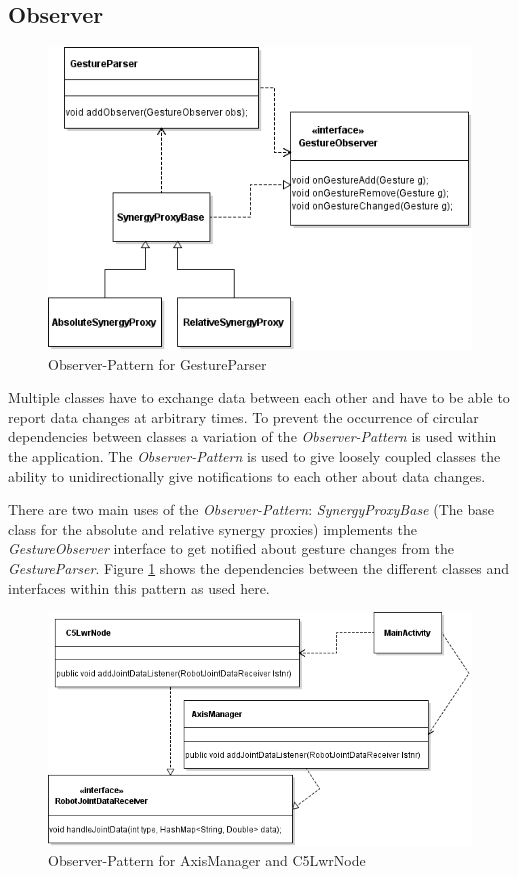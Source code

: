 \subsection{Observer}
\label{sec:conc:obs}
\begin{figure}
	\caption{\label{fig:conc:obs1}Observer-Pattern for GestureParser}
	\begin{center}
		\includegraphics[width=0.75\linewidth]{assets/chpt_concepts/sw/gesture_observer.png}
	\end{center}	
\end{figure}

Multiple classes have to exchange data between each other and have to be able to report data changes at arbitrary times. To prevent the occurrence of circular dependencies between classes a variation of the \textit{Observer-Pattern} is used within the application. The \textit{Observer-Pattern} is used to give loosely coupled classes the ability to unidirectionally give notifications to each other about data changes\cite{Eilebrecht2013}.

There are two main uses of the \textit{Observer-Pattern}: 
\textit{SynergyProxyBase} (The base class for the absolute and relative synergy proxies) implements the \textit{GestureObserver} interface to get notified about gesture changes from the \textit{GestureParser}. Figure \ref{fig:conc:obs1} shows the dependencies between the different classes and interfaces within this pattern as used here.

\begin{figure}
	\caption{Observer-Pattern for AxisManager and C5LwrNode\label{fig:conc:obs2}}
	\begin{center}
		\includegraphics[width=0.85\linewidth]{assets/chpt_concepts/sw/node_axismanager.png}
	\end{center}	
\end{figure}

